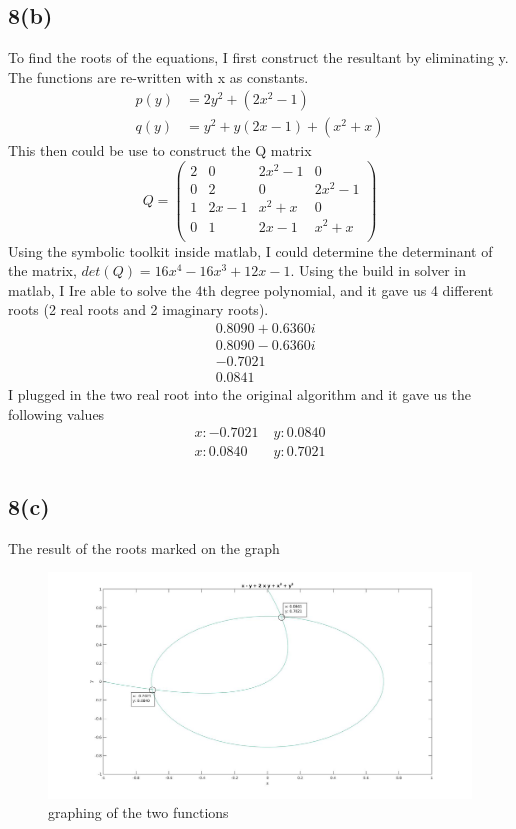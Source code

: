 \documentclass{article}
\begin{document}
\subsection*{8(b)}
To find the roots of the equations, I first construct the resultant by eliminating y. The functions are re-written with x as constants.
\begin{equation*}
\begin{aligned}
p(y) &= 2y^2 + (2x^2-1)\\
q(y) &= y^2 + y(2x-1) + (x^2 +x)
\end{aligned}
\end{equation*}
This then could be use to construct the Q matrix
\begin{equation*}
Q = 
\begin{pmatrix}
2 & 0 & 2x^2-1 & 0\\
0 & 2 & 0 & 2x^2 -1 \\
1 & 2x-1 & x^2+x & 0 \\
0 & 1 & 2x-1 & x^2+x\\ 
\end{pmatrix}
\end{equation*}
Using the symbolic toolkit inside matlab, I could determine the determinant of the matrix, $det(Q) = 16x^4 - 16x^3 + 12x - 1$. Using the build in solver in matlab, I Ire able to solve the 4th degree polynomial, and it gave us 4 different roots (2 real roots and 2 imaginary roots).
\begin{equation*}
\begin{aligned}
   &0.8090 + 0.6360i\\
   &0.8090 - 0.6360i\\
  &-0.7021 \\
   &0.0841 
\end{aligned}
\end{equation*}
I plugged in the two real root into the original algorithm and it gave us the following values
\begin{equation*}
\begin{aligned}
	x: -0.7021 \;&y:0.0840\\
	x: 0.0840 \;&y:0.7021
\end{aligned}
\end{equation*}
\subsection*{8(c)}
The result of the roots marked on the graph
\begin{figure}[H]
\centering
\includegraphics[width=5in]{p8-2.jpg}
\caption{graphing of the two functions}
\end{figure}
\end{document}
